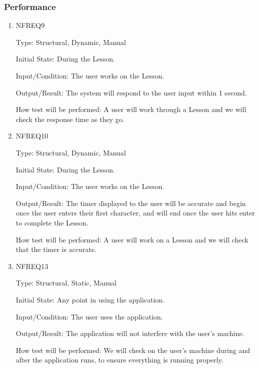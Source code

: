 \documentclass[12pt, titlepage]{article}
\begin{document}
\subsubsection{Performance}
\begin{enumerate}

\item{NFREQ9\\}

Type: Structural, Dynamic, Manual
					
Initial State: During the Lesson.
					
Input/Condition: The user works on the Lesson.
					
Output/Result: The system will respond to the user input within 1 second.
					
How test will be performed: A user will work through a Lesson and we will check the response time as they go. 

\item{NFREQ10\\}

Type: Structural, Dynamic, Manual
					
Initial State: During the Lesson.
					
Input/Condition: The user works on the Lesson.
					
Output/Result: The timer displayed to the user will be accurate and begin once the user enters their first character, and will end once the user hits enter to complete the Lesson.
					
How test will be performed: A user will work on a Lesson and we will check that the timer is accurate.

\item{NFREQ13\\}

Type: Structural, Static, Manual
					
Initial State: Any point in using the application.
					
Input/Condition: The user uses the application.
					
Output/Result: The application will not interfere with the user's machine.
					
How test will be performed: We will check on the user's machine during and after the application runs, to ensure everything is running properly.

\end{enumerate}
\end{document}
